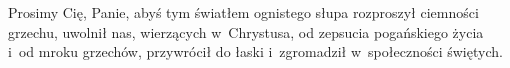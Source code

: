 Prosimy Cię, Panie, abyś tym światłem ognistego słupa rozproszył ciemności
grzechu, uwolnił nas, wierzących w~Chrystusa, od zepsucia pogańskiego życia
i~od mroku grzechów, przywrócił do łaski i~zgromadził w~społeczności świętych.%
\endinput
